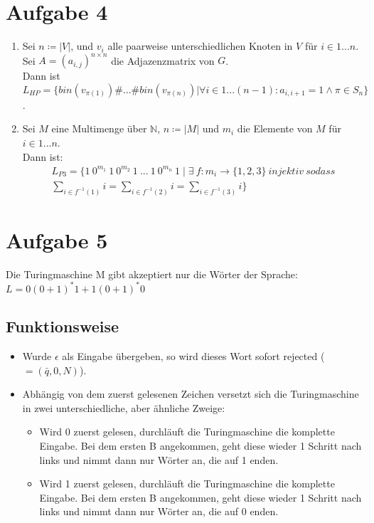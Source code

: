 \documentclass[a4paper,11pt]{scrartcl}
\begin{document}
	\section*{Aufgabe 4}
	\begin{enumerate}[label=\alph*)]
		\item Sei $n \coloneqq \vert V \vert$, und $v_i$ alle paarweise unterschiedlichen Knoten in $V$ für $i \in 1...n$. Sei $A=(a_{i,j})^{n \times n}$ die Adjazenzmatrix von $G$. \\
			  Dann ist $L_{HP} = \{bin(v_{\pi (1)}) \# ... \# bin(v_{\pi (n)}) \vert \forall i \in 1...(n-1): a_{i,i+1} = 1 \land \pi \in S_n\}$.
		\item Sei $M$ eine Multimenge über $\mathbb{N}$, $n \coloneqq \vert M \vert$ und $m_i$ die Elemente von $M$ für $i \in 1...n$. \\
			  Dann ist:
			  \begin{multline*}
			  L_{P3} = \{ 1 \ 0^{m_1} \ 1 \ 0^{m_2} \ 1 \ ... \ 1 \ 0^{m_n} \ 1 \mid \exists \ f: m_i \rightarrow \{1, 2, 3\} \ injektiv \ sodass \\ \sum_{i \in f^{-1}(1)} i = \sum_{i \in f^{-1}(2)} i = \sum_{i \in f^{-1}(3)} i\}
			  \end{multline*}
	\end{enumerate}
	
	
	\section*{Aufgabe 5}
	Die Turingmaschine M gibt akzeptiert nur die Wörter der Sprache: \\
	$L = 0(0+1)^* 1 + 1(0+1)^* 0$
	\subsection*{Funktionsweise}
	\begin{itemize}
	\item Wurde $\epsilon$ als Eingabe übergeben, so wird dieses Wort sofort rejected ($=(\bar{q},0,N)$).
	\item Abhängig von dem zuerst gelesenen Zeichen versetzt sich die Turingmaschine in zwei unterschiedliche, aber ähnliche Zweige:
		\begin{itemize}
		\item Wird 0 zuerst gelesen, durchläuft die Turingmaschine die komplette Eingabe. Bei dem ersten B angekommen, geht diese wieder 1 Schritt nach links und nimmt dann nur Wörter an, die auf 1 enden.
		\item Wird 1 zuerst gelesen, durchläuft die Turingmaschine die komplette Eingabe. Bei dem ersten B angekommen, geht diese wieder 1 Schritt nach links und nimmt dann nur Wörter an, die auf 0 enden.
		\end{itemize}
	\end{itemize}
	
\end{document}
